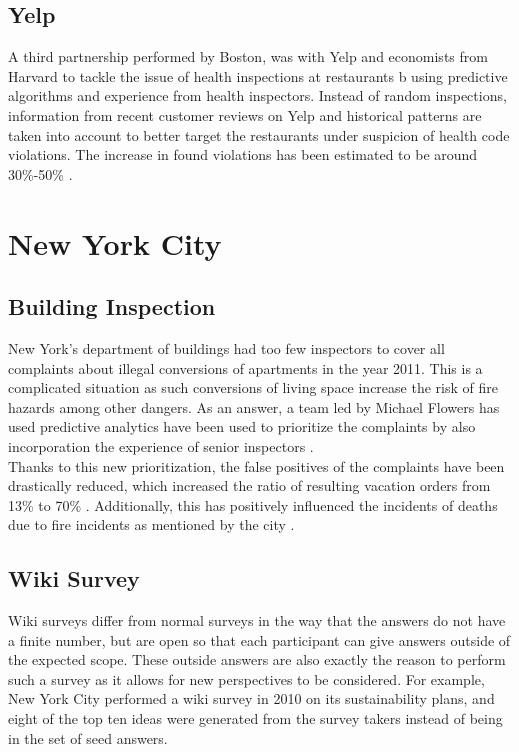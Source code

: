 \documentclass[a4paper,12pt]{report}
\begin{document}
		\subsection[Yelp]{Yelp \cite{YelpBoston}}
		\startsubsection
			A third partnership performed by Boston, was with Yelp and economists from Harvard to tackle the issue of health inspections at restaurants b using predictive algorithms and experience from health inspectors.
			Instead of random inspections, information from recent customer reviews on Yelp and historical patterns are taken into account to better target the restaurants under suspicion of health code violations. The increase in found violations has been estimated to be around 30\%-50\% \cite{BSL16} \cite{Gla16}.
		\closesection
	\closesection
	
	\section{New York City}
	\startsection
		\subsection{Building Inspection}
		\startsubsection
			New York's department of buildings had too few inspectors to cover all complaints about illegal conversions of apartments in the year 2011. This is a complicated situation as such conversions of living space increase the risk of fire hazards among other dangers. As an answer, a team led by Michael Flowers has used predictive analytics have been used to prioritize the complaints by also incorporation the experience of senior inspectors \cite{BeyondOpenData}.\\
			Thanks to this new prioritization, the false positives of the complaints have been drastically reduced, which increased the ratio of resulting vacation orders from 13\% to 70\% \cite{PredictiveDataAnalytics}.
			Additionally, this has positively influenced the incidents of deaths due to fire incidents as mentioned by the city \cite{BigDataBigApple} \cite{FDNY}.
		\closesection
		\subsection[Wiki Survey]{Wiki Survey \cite{BitbyBit}}
		\startsubsection
			Wiki surveys differ from normal surveys in the way that the answers do not have a finite number, but are open so that each participant can give answers outside of the expected scope. These outside answers are also exactly the reason to perform such a survey as it allows for new perspectives to be considered. For example, New York City performed a wiki survey in 2010 on its sustainability plans, and eight of the top ten ideas were generated from the survey takers instead of being in the set of seed answers.
		\closesection
	\closesection
	
\end{document}
